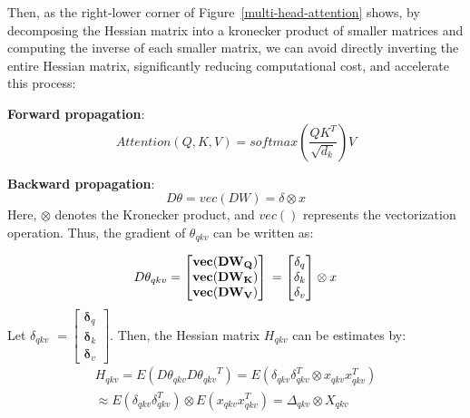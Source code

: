 \documentclass{article} %
\begin{document}
Then, as the right-lower corner of Figure~\ref{multi-head-attention} shows, by decomposing the Hessian matrix into a kronecker product of smaller matrices and computing the inverse of each smaller matrix, we can avoid directly inverting the entire Hessian matrix, significantly reducing computational cost, and accelerate this process:

\textbf{Forward propagation}:
\begin{equation}
    Attention(Q,K,V) = softmax(\frac{QK^{T}}{\sqrt{d_k}})V
\end{equation}


\textbf{Backward propagation}:
\begin{equation}
    D\theta =vec(DW)=\delta\otimes x
\end{equation}
Here, $\otimes$ denotes the Kronecker product, and $vec()$ represents the vectorization operation. Thus, the gradient of $\theta_{qkv}$ can be written as:

\begin{equation}
    D\theta_{qkv} = \begin{bmatrix} \mathbf{vec(DW_Q)} \\ \mathbf{vec(DW_K)} \\ \mathbf{vec(DW_V)} \end{bmatrix} \\
 = \begin{bmatrix} \mathbf{\delta}_q \\ \mathbf{\delta}_k \\ \mathbf{\delta}_v \end{bmatrix} \otimes x
\end{equation}
Let $\delta_{qkv}$
 $= \begin{bmatrix} \mathbf{\delta}_q \\ \mathbf{\delta}_k \\ \mathbf{\delta}_v \end{bmatrix} $. Then, the Hessian matrix $H_{qkv}$ can be estimates by:
\begin{equation}
\begin{aligned}
    H_{qkv} = E(D\theta_{qkv} {D\theta_{qkv}}^T)=E(\delta_{qkv}\delta_{qkv}^T\otimes x_{qkv}x_{qkv}^T) \\
    \approx E(\delta_{qkv}\delta_{qkv}^T) \otimes E(x_{qkv}x_{qkv}^T) = \Delta_{qkv} \otimes X_{qkv}
\end{aligned}
\end{equation}
\end{document}

